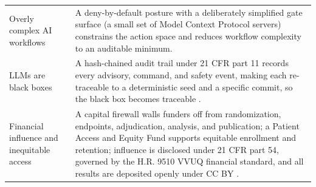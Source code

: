 \begin{table}[htbp]
\begin{tabularx}{\textwidth}{L{5.5cm} Y}
Overly complex AI workflows & A deny-by-default posture with a deliberately simplified gate surface (a small set of Model Context Protocol servers) constrains the action space and reduces workflow complexity to an auditable minimum. \\
LLMs are black boxes & A hash-chained audit trail under 21 CFR part 11 records every advisory, command, and safety event, making each re-traceable to a deterministic seed and a specific commit, so the black box becomes traceable \cite{kawchak2026adapt312}. \\
Financial influence and inequitable access & A capital firewall walls funders off from randomization, endpoints, adjudication, analysis, and publication; a Patient Access and Equity Fund supports equitable enrollment and retention; influence is disclosed under 21 CFR part 54, governed by the H.R. 9510 VVUQ financial standard, and all results are deposited openly under CC BY \cite{kawchak2026hr9510,ecfr2026part54}. \\
\bottomrule
\end{tabularx}
\end{table}

